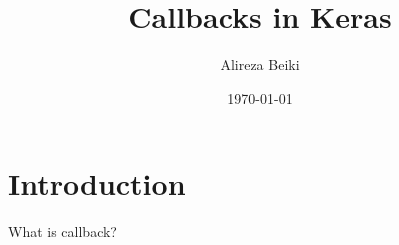 \documentclass{beamer}
\title{Callbacks in Keras}
\author{Alireza Beiki} %
\institute[] %
{
University of Shiraz \\ %
\medskip
}
\date{\today} %
\begin{document}
\begin{frame}
\titlepage %
\end{frame}


\begin{frame}
\tableofcontents
\end{frame}

\section{Introduction}

\begin{frame}{What is callback?}

\end{frame}
\end{document}
